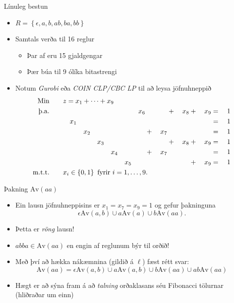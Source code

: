 \documentclass[icelandic]{beamer}
\newcommand{\Av}{\mathrm{Av}}
\begin{document}
\begin{frame}{Línuleg bestun}
  \begin{itemize}[<+->]
    \item $R = \left \{ \epsilon, a, b, ab, ba, bb \right \}$
    \item Samtals verða til 16 reglur
      \begin{itemize}
        \item Þar af eru 15 gjaldgengar
        \item Þær búa til 9 ólíka bitastrengi
      \end{itemize}
    \item Notum \emph{Gurobi} eða \emph{COIN CLP/CBC LP} til að leysa jöfnuhneppið 
        \begin{alignat*}{17}
          \text{Min}    \qquad  & \mathrlap{z = x_1 + \cdots + x_9} & & & & & & & & & & & & & & & \\
          \text{þ.a.}   \qquad  & &     &     &     &     &     &     &     &     &     &     & x_6 &     &     & +{} & x_8 & +{} & x_9 & ={}  &  1 \\
                                & & x_1 &     &     &     &     &     &     &     &     &     &     &     &     &     &     &     &     & ={}  &  1 \\
                                & &     &     & x_2 &     &     &     &     &     &     &     &     & +{} & x_7 &     &     &     &     & ={}  &  1 \\
                                & &     &     &     &     & x_3 &     &     &     &     &     &     &     &     & +{} & x_8 & +{} & x_9 & ={}  &  1 \\
                                & &     &     &     &     &     &     & x_4 &     &     &     &     & +{} & x_7 &     &     &     &     & ={}  &  1 \\
                                & &     &     &     &     &     &     &     &     & x_5 &     &     &     &     &     &     & +{} & x_9 & ={}  &  1 \\
          \text{m.t.t.} \qquad  & \mathrlap{x_i \in \left\{ 0, 1 \right\} \text{ fyrir } i = 1, \ldots, 9.} & & & & & & & & & & & & & & &
      \end{alignat*}
  \end{itemize}
\end{frame}

\begin{frame}{Þakning $\Av(aa)$}
\begin{itemize}[<+->]
  \item Ein lausn jöfnuhneppisins er $x_1 = x_7 = x_9 = 1$ og gefur þakninguna \[ \epsilon \Av(a,b) \cup a \Av(a) \cup b \Av(aa) .\]
  \item Þetta er \emph{röng} lausn!
  \item $abba \in \Av(aa)$ en engin af reglunum býr til orðið!
  \item Með því að hækka nákæmnina (gildið á $\ell$) fæst rétt svar: \[\Av(aa) = \epsilon \Av(a,b) \cup a \Av(a,b) \cup b \Av(aa) \cup ab \Av(aa)\]
  \item Hægt er að sýna fram á að \emph{talning} orðaklasans séu Fibonacci tölurnar (hliðraðar um einn)
\end{itemize}
\end{frame}
\end{document}
